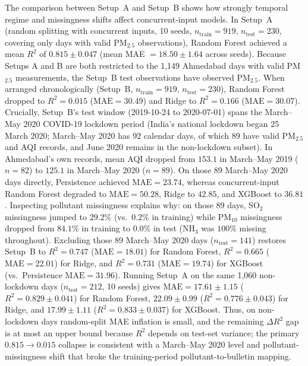 The comparison between Setup~A and Setup~B shows how strongly temporal regime and missingness shifts affect concurrent-input models. In Setup~A (random splitting with concurrent inputs, 10 seeds, $n_{\text{train}} = 919$, $n_{\text{test}} = 230$, covering only days with valid PM$_{2.5}$ observations), Random Forest achieved a mean $R^2$ of $\mathbf{0.815 \pm 0.047}$ (mean MAE $= 18.50 \pm 1.64$ across seeds). Because Setups A and B are both restricted to the 1,149 Ahmedabad days with valid PM$_{2.5}$ measurements, the Setup~B test observations have observed PM$_{2.5}$. When arranged chronologically (Setup~B, $n_{\text{train}} = 919$, $n_{\text{test}} = 230$), Random Forest dropped to $R^2 = \mathbf{0.015}$ ($\text{MAE} = 30.49$) and Ridge to $R^2 = 0.166$ ($\text{MAE} = 30.07$). Crucially, Setup~B's test window (2019-10-24 to 2020-07-01) spans the March--May 2020 COVID-19 lockdown period (India's national lockdown began 25 March 2020; March--May 2020 has 92 calendar days, of which 89 have valid PM$_{2.5}$ and AQI records, and June 2020 remains in the non-lockdown subset). In Ahmedabad's own records, mean AQI dropped from $153.1$ in March--May 2019 ($n=82$) to $125.1$ in March--May 2020 ($n=89$). On those 89 March--May 2020 days directly, Persistence achieved $\text{MAE} = 23.74$, whereas concurrent-input Random Forest degraded to $\text{MAE} = 50.28$, Ridge to $42.85$, and XGBoost to $36.81$. Inspecting pollutant missingness explains why: on those 89 days, SO$_2$ missingness jumped to $29.2\%$ (vs.\ $0.2\%$ in training) while PM$_{10}$ missingness dropped from $84.1\%$ in training to $0.0\%$ in test (NH$_3$ was $100\%$ missing throughout). Excluding those 89 March--May 2020 days ($n_{\text{test}} = 141$) restores Setup~B to $R^2 = 0.747$ ($\text{MAE} = 18.01$) for Random Forest, $R^2 = 0.665$ ($\text{MAE} = 22.01$) for Ridge, and $R^2 = 0.731$ ($\text{MAE} = 19.74$) for XGBoost (vs.\ Persistence $\text{MAE} = 31.96$). Running Setup~A on the same 1,060 non-lockdown days ($n_{\text{test}} = 212$, 10 seeds) gives $\text{MAE} = 17.61 \pm 1.15$ ($R^2 = 0.829 \pm 0.041$) for Random Forest, $22.09 \pm 0.99$ ($R^2 = 0.776 \pm 0.043$) for Ridge, and $17.99 \pm 1.11$ ($R^2 = 0.833 \pm 0.037$) for XGBoost. Thus, on non-lockdown days random-split MAE inflation is small, and the remaining $\Delta R^2$ gap is at most an upper bound because $R^2$ depends on test-set variance; the primary $0.815 \rightarrow 0.015$ collapse is consistent with a March--May 2020 level and pollutant-missingness shift that broke the training-period pollutant-to-bulletin mapping.

